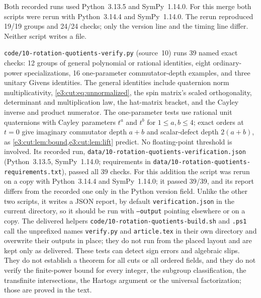 \documentclass[11pt,letterpaper]{article}
\numberwithin{equation}{section}
\theoremstyle{definition}
\theoremstyle{remark}
\begin{document}
Both recorded runs used Python~3.13.5 and SymPy~1.14.0. For this merge both
scripts were rerun with Python~3.14.4 and SymPy~1.14.0. The rerun reproduced
19/19 groups and 24/24 checks; only the version line and the timing line
differ. Neither script writes a file.

\texttt{code/10-rotation-quotients-verify.py} (source~10) runs 39 named exact
checks: 12 groups of general polynomial or rational identities, eight
ordinary-power specializations, 16 one-parameter commutator-depth examples, and
three unitary Givens identities. The general identities include quaternion norm
multiplicativity, \cref{e3:cut:eq:unnormalized}, the spin matrix's scaled
orthogonality, determinant and multiplication law, the hat-matrix bracket, and
the Cayley inverse and product numerator. The one-parameter tests use rational
unit quaternions with Cayley parameters $t^a$ and $t^b$ for $1\le a,b\le4$;
exact orders at $t=0$ give imaginary commutator depth $a+b$ and scalar-defect
depth $2(a+b)$, as \cref{e3:cut:lem:bound,e3:cut:lem:lift} predict. No
floating-point threshold is involved. Its recorded run,
\texttt{data/10-rotation-quotients-verification.json} (Python~3.13.5,
SymPy~1.14.0; requirements in
\texttt{data/10-rotation-quotients-requirements.txt}), passed all 39 checks. For
this addition the script was rerun on a copy with Python~3.14.4 and
SymPy~1.14.0; it passed 39/39, and its report differs from the recorded one only
in the Python version field. Unlike the other two scripts, it writes a JSON
report, by default \texttt{verification.json} in the current directory, so it
should be run with \texttt{--output} pointing elsewhere or on a copy. The
delivered helpers \texttt{code/10-rotation-quotients-build.sh} and
\texttt{.ps1} call the unprefixed names \texttt{verify.py} and
\texttt{article.tex} in their own directory and overwrite their outputs in
place; they do not run from the placed layout and are kept only as delivered.
These tests can detect sign errors and algebraic slips. They do not establish a
theorem for all cuts or all ordered fields, and they do not verify the
finite-power bound for every integer, the subgroup classification, the
transfinite intersections, the Hartogs argument or the universal
factorization; those are proved in the text.
\end{document}
